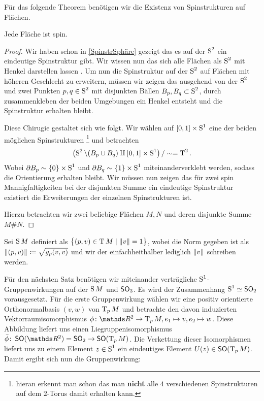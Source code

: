 Für das folgende Theorem benötigen wir die Existenz von Spinstrukturen
auf Flächen.
\begin{Satz}\label{existenzspinflächen}
	Jede Fläche ist spin.
	\begin{proof}
		Wir haben schon in \cref{SpinstrSphäre} gezeigt das es 
		auf der $ \S^2 $ ein eindeutige Spinstruktur gibt. Wir
		wissen nun das sich alle Flächen als $ \S^2 $ mit Henkel 
		darstellen lassen . Um nun die Spinstruktur auf der $ \S^2 $
		auf Flächen mit höheren Geschlecht zu erweitern, müssen
		wir zeigen das ausgehend von der $ \S^2 $ und zwei Punkten
		$ p,q \in\S^2 $ mit disjunkten Bällen $ B_p,B_q \subset\S^2$,
		durch zusammenkleben der beiden Umgebungen ein Henkel
		entsteht und die Spinstruktur erhalten bleibt.
		
		Diese Chirugie gestaltet sich wie folgt. Wir wählen auf
		$ [0,1] \times \S^1 $ eine der beiden möglichen Spinstrukturen \footnote{hieran erkennt man schon das man \textbf{nicht} alle $ 4 $ verschiedenen Spinstrukturen auf dem $ 2 $-Torus damit erhalten kann.} und betrachten 
		\begin{gather*}
		 \left( \S^2 \setminus (B_p \cup B_q) \amalg [0,1]\times \S^1 \right) / \sim = \TT^2.
		\end{gather*}
		Wobei $ \partial B_p \sim \{ 0 \}\times \S^1$ und $ \partial B_q \sim \{ 1 \}\times \S^1$ miteinanderverklebt werden, sodass die Orientierung
		erhalten bleibt.
		Wir müssen nun zeigen das für zwei spin Mannigfaltigkeiten bei 
		der disjunkten Summe ein eindeutige Spinstruktur existiert die 
		Erweiterungen der einzelnen Spinstrukturen ist.
	
		Hierzu betrachten wir zwei beliebige Flächen $ M,N $ und deren
		disjunkte Summe $ M \# N $. 	 
	\end{proof}
\end{Satz}

Sei $\S M$ definiert als $\set{(p,v) \in \TT M}{ \norm{v} = 1}$, wobei
die Norm gegeben ist als $ \norm{(p,v)} \coloneqq \sqrt{g_p(v,v)} $
und wir der einfachheithalber lediglich $ \norm{v} $ schreiben werden.

Für den nächsten Satz benötigen wir miteinander verträgliche $ \S^1 $-Gruppenwirkungen auf der $ \S M $ und $ \so_3 $. Es wird der
Zusammenhang $ \S^1 \simeq \so_2 $ vorausgesetzt. Für die erste
Gruppenwirkung wählen wir eine positiv orientierte Orthonormalbasis
$ (v,w) $ von $ \tang{p}{M} $ und betrachte den davon induzierten
Vektorraumisomorphismus $ \abb{\phi}{\R^2}{\tang{p}{M}},e_1 \mapsto v, e_2\mapsto w $. Diese
Abbildung liefert uns einen Liegruppenisomorphismus $\abb{\bar{\phi}}{\so(\R^2) = \so_2}{\so(\tang{p}{M})} $. Die Verkettung
dieser Isomorphismen liefert uns zu einem Element $ z\in\S^1 $ ein
eindeutiges Element $ U(z)\in \so(\tang{p}{M}) $. Damit ergibt sich
nun die Gruppenwirkung:

